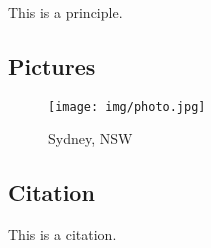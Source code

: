 \documentclass{article}
\begin{document}
\begin{principle}
    This is a principle.
\end{principle}


\subsection{Pictures}

\begin{figure}[htbp]
    \center
    \texttt{[image: img/photo.jpg]}
    \caption{Sydney, NSW}
\end{figure}

\subsection{Citation}

This is a citation\cite{Eg}.

\newpage





\end{document}
